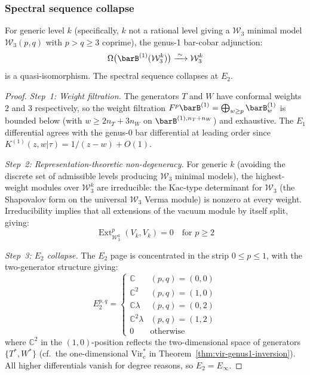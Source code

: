 \subsubsection{Spectral sequence collapse}

\begin{theorem}
\label{thm:w3-genus1-inversion}
For generic level $k$ (specifically, $k$ not a rational level giving a
$\mathcal{W}_3$ minimal model $\mathcal{W}_3(p,q)$ with $p > q \geq 3$
coprime), the genus-1 bar-cobar adjunction:
\begin{equation}
\Omega\bigl(\barB^{(1)}(\mathcal{W}_3^k)\bigr)
  \xrightarrow{\;\sim\;} \mathcal{W}_3^k
\end{equation}
is a quasi-isomorphism.  The spectral sequence collapses at $E_2$.
\end{theorem}

\begin{proof}
\emph{Step~1: Weight filtration.}
The generators $T$ and $W$ have conformal weights $2$ and $3$
respectively, so the weight filtration
$F^p\barB^{(1)} = \bigoplus_{w \geq p} \barB^{(1)}_w$ is bounded below
(with $w \geq 2n_T + 3n_W$ on $\barB^{(1),n_T+n_W}$) and exhaustive.
The $E_1$ differential agrees with the genus-0 bar differential at
leading order since
$K^{(1)}(z,w|\tau) = 1/(z-w) + O(1)$.

\emph{Step~2: Representation-theoretic non-degeneracy.}
For generic $k$ (avoiding the discrete set of admissible levels
producing $\mathcal{W}_3$ minimal models), the highest-weight
modules over $\mathcal{W}_3^k$ are irreducible: the Kac-type
determinant for $\mathcal{W}_3$ (the Shapovalov form on the
universal $\mathcal{W}_3$ Verma module) is nonzero at every weight.
Irreducibility implies that all extensions of the vacuum module by
itself split, giving:
\begin{equation}
\operatorname{Ext}^p_{\mathcal{W}_3^k}(V_k, V_k) = 0
  \quad \text{for } p \geq 2
\end{equation}

\emph{Step~3: $E_2$ collapse.}
The $E_2$ page is concentrated in the strip $0 \leq p \leq 1$, with the
two-generator structure giving:
\begin{equation}
E_2^{p,q} = \begin{cases}
\mathbb{C} & (p,q) = (0,0) \\
\mathbb{C}^2 & (p,q) = (1,0) \\
\mathbb{C}\lambda & (p,q) = (0,2) \\
\mathbb{C}^2 \lambda & (p,q) = (1,2) \\
0 & \text{otherwise}
\end{cases}
\end{equation}
where $\mathbb{C}^2$ in the $(1,0)$-position reflects the two-dimensional
space of generators $\{T^*, W^*\}$ (cf.\ the one-dimensional
$\mathrm{Vir}_c^*$ in Theorem~\ref{thm:vir-genus1-inversion}).
All higher differentials vanish for degree reasons, so
$E_2 = E_\infty$.
\end{proof}

